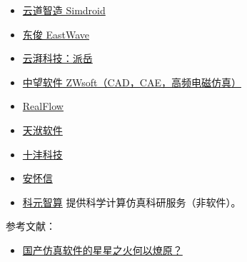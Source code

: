 
\begin{itemize}
\item \href{https://www.ibe.cn/}{云道智造 Simdroid}
\item \href{https://www.eastfdtd.com/index.aspx}{东俊 EastWave}
\item \href{https://www.yunpaikeji.com.cn/cpfw}{云湃科技：派岳}
\item \href{https://www.zwsoft.cn/product/cae/waves}{中望软件 ZWsoft（CAD，CAE，高频电磁仿真）}
\item \href{https://www.realflow.com.cn/}{RealFlow}
\item \href{https://www.njtf.cn/}{天洑软件}
\item \href{https://www.tenfong.cn/}{十沣科技}
\item \href{http://www.anwiseglobal.cn/}{安怀信}
\item \href{https://www.keyuanzhisuan.com/}{科元智算} 提供科学计算仿真科研服务（非软件）。
\end{itemize}

参考文献：
\begin{itemize}
\item \href{https://mp.weixin.qq.com/s?__biz=MjM5NDU4NzcwMw==&mid=2650526904&idx=2&sn=5b2fac0720b9f8effd9b10092cf31cfe&chksm=be8a01e089fd88f638c790b7526dd6b90f4a7eb581b7f1575af8d5c97b3e99e32d797a3aaf01&scene=27}{国产仿真软件的星星之火何以燎原？}
\end{itemize}

